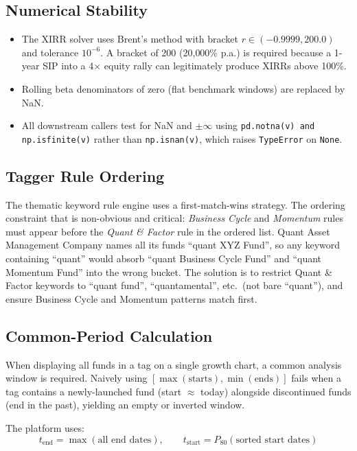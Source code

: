 \documentclass[12pt, a4paper]{article}
\begin{document}
\subsection{Numerical Stability}

\begin{itemize}
  \item The XIRR solver uses Brent's method with bracket
    $r \in (-0.9999, 200.0)$ and tolerance $10^{-6}$.  A bracket of 200
    (20{,}000\% p.a.) is required because a 1-year SIP into a 4$\times$
    equity rally can legitimately produce XIRRs above 100\%.
  \item Rolling beta denominators of zero (flat benchmark windows) are
    replaced by NaN.
  \item All downstream callers test for NaN and $\pm\infty$ using
    \texttt{pd.notna(v) and np.isfinite(v)} rather than
    \texttt{np.isnan(v)}, which raises \texttt{TypeError} on
    \texttt{None}.
\end{itemize}

\subsection{Tagger Rule Ordering}

The thematic keyword rule engine uses a first-match-wins strategy.  The
ordering constraint that is non-obvious and critical: \emph{Business Cycle}
and \emph{Momentum} rules must appear before the \emph{Quant \& Factor} rule
in the ordered list.  Quant Asset Management Company names all its funds
``quant XYZ Fund'', so any keyword containing ``quant'' would absorb
``quant Business Cycle Fund'' and ``quant Momentum Fund'' into the wrong
bucket.  The solution is to restrict Quant \& Factor keywords to
``quant fund'', ``quantamental'', etc.\ (not bare ``quant''), and ensure
Business Cycle and Momentum patterns match first.

\subsection{Common-Period Calculation}

When displaying all funds in a tag on a single growth chart, a common
analysis window is required.  Naively using $[\max(\text{starts}),
\min(\text{ends})]$ fails when a tag contains a newly-launched fund
(start $\approx$ today) alongside discontinued funds (end in the past),
yielding an empty or inverted window.

The platform uses:
\[
  t_{\text{end}} = \max(\text{all end dates}), \qquad
  t_{\text{start}} = P_{80}\!\left(\text{sorted start dates}\right)
\]
\end{document}
